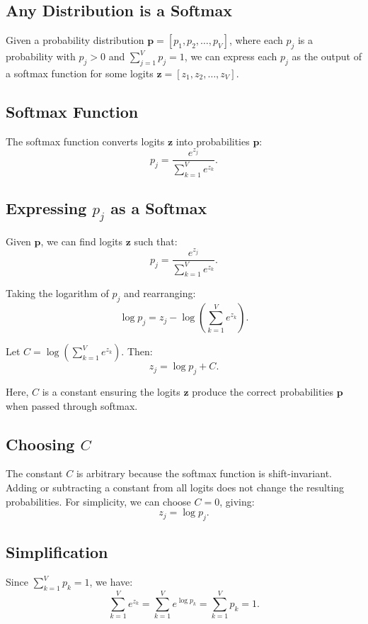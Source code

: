 \begin{notechapter}
\chapter{Any Distribution is a Softmax}\label{ch:distribution-as-softmax}

Given a probability distribution \( \mathbf{p} = [p_1, p_2, \dots, p_V] \),
where each \( p_j \) is a probability with \( p_j > 0 \) and
\( \sum_{j=1}^V p_j = 1 \), we can express each \( p_j \) as the output
of a softmax function for some logits \( \mathbf{z} = [z_1, z_2, \dots, z_V] \).

\section{Softmax Function}
The softmax function converts logits \( \mathbf{z} \) into probabilities
\( \mathbf{p} \):
\[
p_j = \frac{e^{z_j}}{\sum_{k=1}^V e^{z_k}}.
\]

\section{Expressing \( p_j \) as a Softmax}
Given \( \mathbf{p} \), we can find logits \( \mathbf{z} \) such that:
\[
p_j = \frac{e^{z_j}}{\sum_{k=1}^V e^{z_k}}.
\]

Taking the logarithm of \( p_j \) and rearranging:
\[
\log p_j = z_j - \log \left( \sum_{k=1}^V e^{z_k} \right).
\]

Let \( C = \log \left( \sum_{k=1}^V e^{z_k} \right) \). Then:
\[
z_j = \log p_j + C.
\]

Here, \( C \) is a constant ensuring the logits \( \mathbf{z} \) produce
the correct probabilities \( \mathbf{p} \) when passed through softmax.

\section{Choosing \( C \)}
The constant \( C \) is arbitrary because the softmax function is
shift-invariant. Adding or subtracting a constant from all logits does
not change the resulting probabilities. For simplicity, we can choose
\( C = 0 \), giving:
\[
z_j = \log p_j.
\]

\section{Simplification}
Since \( \sum_{k=1}^V p_k = 1 \), we have:
\[
\sum_{k=1}^V e^{z_k} = \sum_{k=1}^V e^{\log p_k} = \sum_{k=1}^V p_k = 1.
\]


\end{notechapter}
